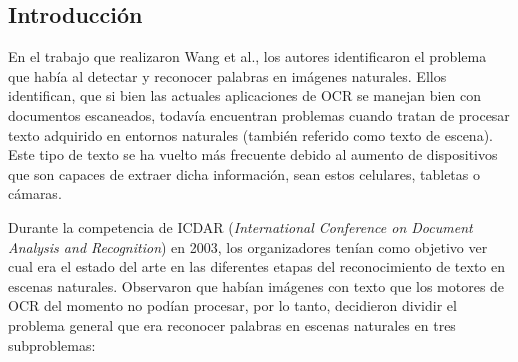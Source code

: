 \subsection{Introducción}

	En el trabajo que realizaron Wang et al., los autores identificaron el problema que había al detectar y reconocer palabras en imágenes naturales. Ellos identifican, que si bien las actuales aplicaciones de OCR se manejan bien con documentos escaneados, todavía encuentran problemas cuando tratan de procesar texto adquirido en entornos naturales (también referido como texto de escena). Este tipo de texto se ha vuelto más frecuente debido al aumento de dispositivos que son capaces de extraer dicha información, sean estos celulares, tabletas o cámaras.
	
	Durante la competencia de ICDAR (\textit{International Conference on Document Analysis and Recognition}) en 2003, los organizadores tenían como objetivo ver cual era el estado del arte en las diferentes etapas del reconocimiento de texto en escenas naturales. Observaron que habían imágenes con texto que los motores de OCR del momento no podían procesar, por lo tanto, decidieron dividir el problema general que era reconocer palabras en escenas naturales en tres subproblemas:
	
